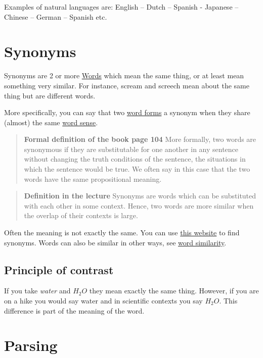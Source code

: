 \documentclass[
  11pt,
  british,
]{article}
\begin{document}
Examples of natural languages are: English -- Dutch -- Spanish -
Japanese -- Chinese -- German -- Spanish etc.

\hypertarget{synonyms}{%
\section{Synonyms}\label{synonyms}}

Synonyms are 2 or more \href{../Data/Words.md}{Words} which mean the
same thing, or at least mean something very similar. For instance,
scream and screech mean about the same thing but are different words.

More specifically, you can say that two \href{../data/lemma.md}{word
forms} a synonym when they share (almost) the same
\href{../data/lemma.md}{word sense}.

\begin{quote}
\textbf{Formal definition of the book page 104} More formally, two words
are synonymous if they are substitutable for one another in any sentence
without changing the truth conditions of the sentence, the situations in
which the sentence would be true. We often say in this case that the two
words have the same propositional meaning.
\end{quote}

\begin{quote}
\textbf{Definition in the lecture} Synonyms are words which can be
substituted with each other in some context. Hence, two words are more
similar when the overlap of their contexts is large.
\end{quote}

Often the meaning is not exactly the same. You can use
\href{https://www.thesaurus.com/browse/scream}{this website} to find
synonyms. Words can also be similar in other ways, see
\href{../Semantic-Similarity/Word\%20similarity.md}{word similarity}.

\hypertarget{principle-of-contrast}{%
\subsection{Principle of contrast}\label{principle-of-contrast}}

If you take \emph{water} and \(H_2O\) they mean exactly the same thing.
However, if you are on a hike you would say water and in scientific
contexts you say \(H_2O\). This difference is part of the meaning of the
word.

\hypertarget{parsing}{%
\section{Parsing}\label{parsing}}
\end{document}
